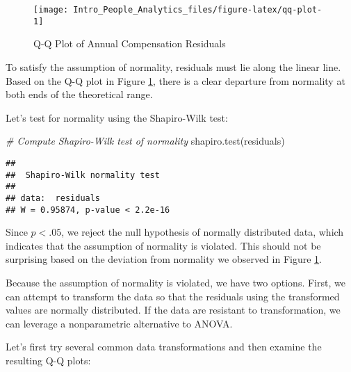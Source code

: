 \documentclass[
]{book}
\newenvironment{Shaded}{\begin{snugshade}}{\end{snugshade}}
\newcommand{\CommentTok}[1]{\textcolor[rgb]{0.56,0.35,0.01}{\textit{#1}}}
\newcommand{\FunctionTok}[1]{\textcolor[rgb]{0.00,0.00,0.00}{#1}}
\newcommand{\NormalTok}[1]{#1}
\begin{document}
\begin{figure}

{\centering \texttt{[image: Intro\_People\_Analytics\_files/figure-latex/qq-plot-1]} 

}

\caption{Q-Q Plot of Annual Compensation Residuals}\label{fig:qq-plot}
\end{figure}

To satisfy the assumption of normality, residuals must lie along the linear line. Based on the Q-Q plot in Figure \ref{fig:qq-plot}, there is a clear departure from normality at both ends of the theoretical range.

Let's test for normality using the Shapiro-Wilk test:

\begin{Shaded}
\begin{Highlighting}[]
\CommentTok{\# Compute Shapiro{-}Wilk test of normality}
\FunctionTok{shapiro.test}\NormalTok{(residuals)}
\end{Highlighting}
\end{Shaded}

\begin{verbatim}
## 
##  Shapiro-Wilk normality test
## 
## data:  residuals
## W = 0.95874, p-value < 2.2e-16
\end{verbatim}

Since \(p < .05\), we reject the null hypothesis of normally distributed data, which indicates that the assumption of normality is violated. This should not be surprising based on the deviation from normality we observed in Figure \ref{fig:qq-plot}.

Because the assumption of normality is violated, we have two options. First, we can attempt to transform the data so that the residuals using the transformed values are normally distributed. If the data are resistant to transformation, we can leverage a nonparametric alternative to ANOVA.

Let's first try several common data transformations and then examine the resulting Q-Q plots:
\end{document}
